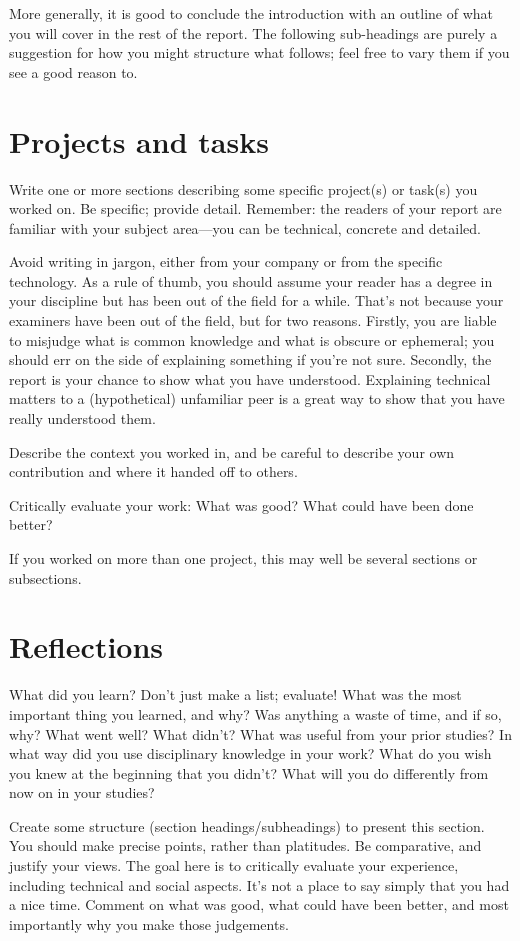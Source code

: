 \documentclass[british,12pt,a4paper]{report}
\begin{document}
More generally, it is good to conclude the introduction with an outline of what you will
cover in the rest of the report.
The following sub-headings are purely a suggestion for how
you might structure what follows;
feel free to vary them if you see a good reason to.

\section{Projects and tasks}

Write one or more sections describing some specific project(s) or task(s) you worked on.
Be specific; provide detail.
Remember: the readers of your report are familiar with your subject area---you can be technical,
concrete and detailed.

Avoid writing in jargon, either from your company or from the specific technology.
As a rule of thumb, you should assume your reader has a degree in your discipline
but has been out of the field for a while.
That's not because your examiners have been out of the field, but for two reasons.
Firstly, you are liable to misjudge what is common knowledge and what is obscure or ephemeral;
you should err on the side of explaining something if you're not sure.
Secondly, the report is your chance to show what you have understood.
Explaining technical matters to a (hypothetical) unfamiliar peer
is a great way to show that you have really understood them.

Describe the context you worked in, and be careful to describe your own contribution
and where it handed off to others.

Critically evaluate your work: What was good? What could have been done better?

If you worked on more than one project, this may well be several sections or subsections.

\section{Reflections}

What did you learn? Don't just make a list; evaluate!
What was the most important thing you learned, and why?
Was anything a waste of time, and if so, why?
What went well? What didn't?
What was useful from your prior studies?
In what way did you use disciplinary knowledge in your work?
What do you wish you knew at the beginning that you didn't?
What will you do differently from now on in your studies?

Create some structure (section headings/subheadings) to present this section.
You should make precise points, rather than platitudes.
Be comparative, and justify your views.
The goal here is to critically evaluate your experience,
including technical and social aspects.
It's not a place to say simply that you had a nice time.
Comment on what was good, what could have been better,
and most importantly why you make those judgements.
\end{document}

